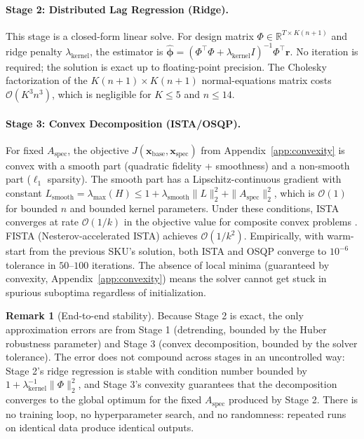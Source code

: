 \documentclass[10pt]{article} %
\theoremstyle{plain}
\theoremstyle{definition}
\newtheorem{remark}{Remark}
\newcommand{\R}{\mathbb{R}}
\newcommand{\xbase}{\mathbf{x}_{\text{base}}}
\newcommand{\xspec}{\mathbf{x}_{\text{spec}}}
\newcommand{\Aspec}{A_{\text{spec}}}
\begin{document}
\paragraph{Stage 2: Distributed Lag Regression (Ridge).} This stage is a closed-form linear solve. For design matrix $\Phi \in \R^{T \times K(n+1)}$ and ridge penalty $\lambda_{\text{kernel}}$, the estimator is $\hat{\boldsymbol{\phi}} = (\Phi^\top \Phi + \lambda_{\text{kernel}} I)^{-1} \Phi^\top \mathbf{r}$. No iteration is required; the solution is exact up to floating-point precision. The Cholesky factorization of the $K(n+1) \times K(n+1)$ normal-equations matrix costs $\mathcal{O}(K^3 n^3)$, which is negligible for $K \leq 5$ and $n \leq 14$.

\paragraph{Stage 3: Convex Decomposition (ISTA/OSQP).} For fixed $\Aspec$, the objective $J(\xbase, \xspec)$ from Appendix~\ref{app:convexity} is convex with a smooth part (quadratic fidelity + smoothness) and a non-smooth part ($\ell_1$ sparsity). The smooth part has a Lipschitz-continuous gradient with constant $L_{\text{smooth}} = \lambda_{\max}(H) \leq 1 + \lambda_{\text{smooth}} \|L\|_2^2 + \|\Aspec\|_2^2$, which is $\mathcal{O}(1)$ for bounded $n$ and bounded kernel parameters. Under these conditions, ISTA converges at rate $\mathcal{O}(1/k)$ in the objective value for composite convex problems \citep{beck2009fast}. FISTA (Nesterov-accelerated ISTA) achieves $\mathcal{O}(1/k^2)$. Empirically, with warm-start from the previous SKU's solution, both ISTA and OSQP converge to $10^{-6}$ tolerance in $50$--$100$ iterations. The absence of local minima (guaranteed by convexity, Appendix~\ref{app:convexity}) means the solver cannot get stuck in spurious suboptima regardless of initialization.

\begin{remark}[End-to-end stability]
Because Stage 2 is exact, the only approximation errors are from Stage 1 (detrending, bounded by the Huber robustness parameter) and Stage 3 (convex decomposition, bounded by the solver tolerance). The error does not compound across stages in an uncontrolled way: Stage 2's ridge regression is stable with condition number bounded by $1 + \lambda_{\text{kernel}}^{-1} \|\Phi\|_2^2$, and Stage 3's convexity guarantees that the decomposition converges to the global optimum for the fixed $\Aspec$ produced by Stage 2. There is no training loop, no hyperparameter search, and no randomness: repeated runs on identical data produce identical outputs.
\end{remark}
\end{document}
